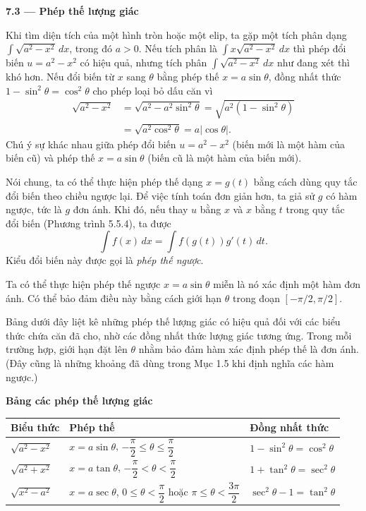\documentclass[12pt,a4paper]{article}
\begin{document}
\begin{center}{\LARGE\bfseries 7.3 — Phép thế lượng giác}\end{center}
Khi tìm diện tích của một hình tròn hoặc một elip, ta gặp một tích phân dạng $\int\sqrt{a^2-x^2}\,dx$, trong đó $a>0$. Nếu tích phân là $\int x\sqrt{a^2-x^2}\,dx$ thì phép đổi biến $u=a^2-x^2$ có hiệu quả, nhưng tích phân $\int\sqrt{a^2-x^2}\,dx$ như đang xét thì khó hơn. Nếu đổi biến từ $x$ sang $\theta$ bằng phép thế $x=a\sin\theta$, đồng nhất thức $1-\sin^2\theta=\cos^2\theta$ cho phép loại bỏ dấu căn vì
\begin{align*}
\sqrt{a^2-x^2}&=\sqrt{a^2-a^2\sin^2\theta}=\sqrt{a^2(1-\sin^2\theta)}\\
&=\sqrt{a^2\cos^2\theta}=a|\cos\theta|.
\end{align*}
Chú ý sự khác nhau giữa phép đổi biến $u=a^2-x^2$ (biến mới là một hàm của biến cũ) và phép thế $x=a\sin\theta$ (biến cũ là một hàm của biến mới).

Nói chung, ta có thể thực hiện phép thế dạng $x=g(t)$ bằng cách dùng quy tắc đổi biến theo chiều ngược lại. Để việc tính toán đơn giản hơn, ta giả sử $g$ có hàm ngược, tức là $g$ đơn ánh. Khi đó, nếu thay $u$ bằng $x$ và $x$ bằng $t$ trong quy tắc đổi biến (Phương trình 5.5.4), ta được
\[\int f(x)\,dx=\int f(g(t))g'(t)\,dt.\]
Kiểu đổi biến này được gọi là \textit{phép thế ngược}.

Ta có thể thực hiện phép thế ngược $x=a\sin\theta$ miễn là nó xác định một hàm đơn ánh. Có thể bảo đảm điều này bằng cách giới hạn $\theta$ trong đoạn $[-\pi/2,\pi/2]$.

Bảng dưới đây liệt kê những phép thế lượng giác có hiệu quả đối với các biểu thức chứa căn đã cho, nhờ các đồng nhất thức lượng giác tương ứng. Trong mỗi trường hợp, giới hạn đặt lên $\theta$ nhằm bảo đảm hàm xác định phép thế là đơn ánh. (Đây cũng là những khoảng đã dùng trong Mục 1.5 khi định nghĩa các hàm ngược.)

\begin{center}\textbf{Bảng các phép thế lượng giác}\end{center}
\begin{longtable}{p{.17\linewidth}p{.47\linewidth}p{.25\linewidth}}
\toprule
Biểu thức & Phép thế & Đồng nhất thức\\\midrule
$\sqrt{a^2-x^2}$ & $x=a\sin\theta$, $-\dfrac\pi2\le\theta\le\dfrac\pi2$ & $1-\sin^2\theta=\cos^2\theta$\\[8pt]
$\sqrt{a^2+x^2}$ & $x=a\tan\theta$, $-\dfrac\pi2<\theta<\dfrac\pi2$ & $1+\tan^2\theta=\sec^2\theta$\\[8pt]
$\sqrt{x^2-a^2}$ & $x=a\sec\theta$, $0\le\theta<\dfrac\pi2$ hoặc $\pi\le\theta<\dfrac{3\pi}2$ & $\sec^2\theta-1=\tan^2\theta$\\
\bottomrule
\end{longtable}
\end{document}
